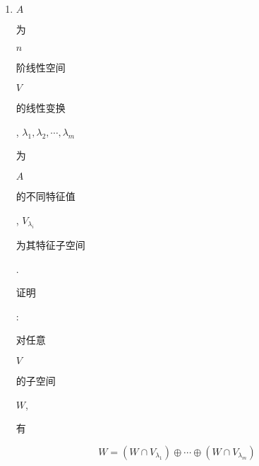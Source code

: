 \documentclass[10pt]{article}
\begin{document}
\begin{enumerate}
  \item $A$ \begin{CJK}{UTF8}{mj}为\end{CJK} $n$ \begin{CJK}{UTF8}{mj}阶线性空间\end{CJK} $V$ \begin{CJK}{UTF8}{mj}的线性变换\end{CJK}, $\lambda_{1}, \lambda_{2}, \cdots, \lambda_{m}$ \begin{CJK}{UTF8}{mj}为\end{CJK} $A$ \begin{CJK}{UTF8}{mj}的不同特征值\end{CJK}, $V_{\lambda_{i}}$ \begin{CJK}{UTF8}{mj}为其特征子空间\end{CJK}. \begin{CJK}{UTF8}{mj}证明\end{CJK}: \begin{CJK}{UTF8}{mj}对任意\end{CJK} $V$ \begin{CJK}{UTF8}{mj}的子空间\end{CJK} $W$, \begin{CJK}{UTF8}{mj}有\end{CJK}

\end{enumerate}
$$
W=\left(W \cap V_{\lambda_{1}}\right) \oplus \cdots \oplus\left(W \cap V_{\lambda_{m}}\right)
$$
\end{document}
